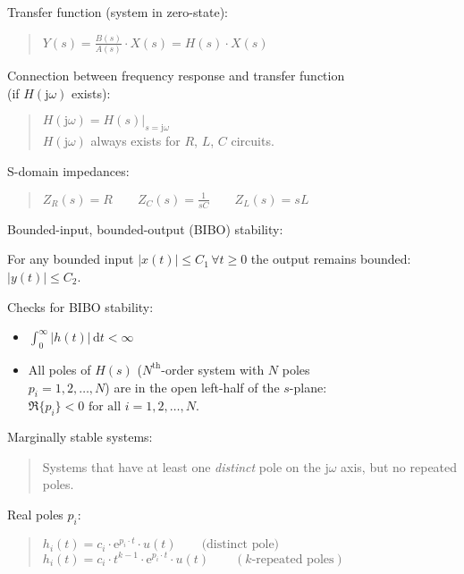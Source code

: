 \documentclass[fontsize=9pt,a4paper,twocolumn]{scrartcl}
\begin{document}
Transfer function (system in zero-state):
\begin{quote}
	$\boxed{Y(s)=\frac{B(s)}{A(s)}\cdot X(s)=H(s)\cdot X(s)}$
\end{quote}

Connection between frequency response and transfer function\\(if $H(\mathrm{j}\omega)$ exists):
\begin{quote}
	$\boxed{H(\mathrm{j}\omega)=\left.H(s)\right|_{s=\mathrm{j}\omega}}$\vspace*{0.25cm}\\
	$H(\mathrm{j}\omega)$ always exists for $R$, $L$, $C$ circuits.
\end{quote}
\newpage
S-domain impedances:
\begin{quote}
	$Z_R(s)=R\quad\quad Z_C(s)=\frac{1}{sC}\quad\quad Z_L(s)=sL$
\end{quote}

Bounded-input, bounded-output (BIBO) stability:
\begin{framed}
		For any bounded input $|x(t)|\leq C_1\,\forall t\geq 0$ the output remains bounded: $|y(t)|\leq C_2$.
\end{framed}

Checks for BIBO stability:
\begin{framed}
	\begin{itemize}
		\item $\int_0^\infty |h(t)|\,\mathrm{d}t<\infty$
		\item All poles of $H(s)$ ($N^\mathrm{th}$-order system with $N$ poles\\ $p_i=1,2,\dots,N$) are in the open left-half of the $s$-plane:\\ $\Re\{p_i\}<0 \text{ for all } i=1,2,\dots,N$.
	\end{itemize}
\end{framed}

Marginally stable systems:
\begin{quote}
	Systems that have at least one \textit{distinct} pole on the $\mathrm{j}\omega$ axis, but no repeated poles.
\end{quote}

Real poles $p_i$:
\begin{quote}
	$h_i(t)=c_i\cdot\mathrm{e}^{p_i\cdot t}\cdot u(t)\qquad\text{(distinct pole)}$\\
	$h_i(t)=c_i\cdot t^{k-1}\cdot\mathrm{e}^{p_i\cdot t}\cdot u(t)\qquad (k\text{-repeated poles})$
\end{quote}
\end{document}
